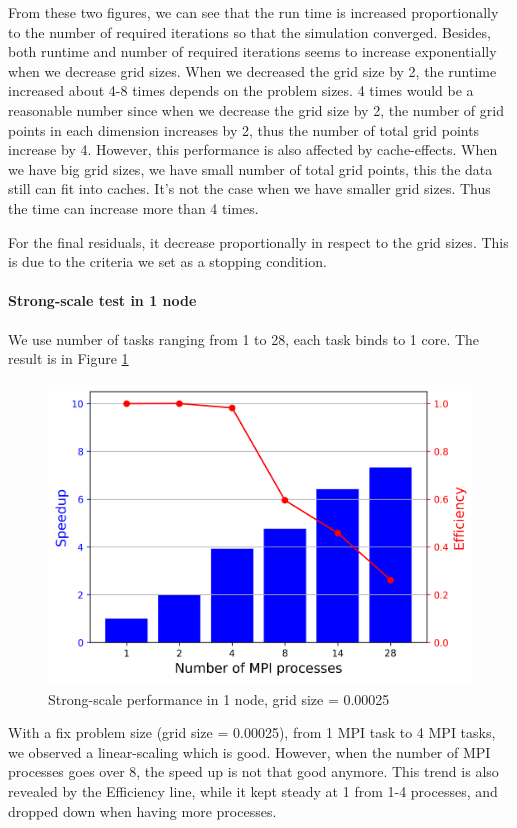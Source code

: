 \documentclass[article]{scrartcl}
\begin{document}
From these two figures, we can see that the run time is increased proportionally to the number of required iterations so that the simulation converged. Besides, both runtime and number of required iterations seems to increase exponentially when we decrease grid sizes. When we decreased the grid size by 2, the runtime increased about 4-8 times depends on the problem sizes. 4 times would be a reasonable number since when we decrease the grid size by 2, the number of grid points in each dimension increases by 2, thus the number of total grid points increase by 4. However, this performance is also affected by cache-effects. When we have big grid sizes, we have small number of total grid points, this the data still can fit into caches. It's not the case when we have smaller grid sizes. Thus the time can increase more than 4 times.

For the final residuals, it decrease proportionally in respect to the grid sizes. This is due to the criteria we set as a stopping condition. 

\paragraph{Strong-scale test in 1 node}
We use number of tasks ranging from 1 to 28, each task binds to 1 core. The result is in Figure \ref{fig:strong1}

\begin{figure}[htpb]
  \centering
  \includegraphics[width=\textwidth,height=8cm,keepaspectratio=true]{../figs/5_strong_1.png}
  \caption{Strong-scale performance in 1 node, grid size = 0.00025}
  \label{fig:strong1}
\end{figure}
With a fix problem size (grid size = 0.00025), from 1 MPI task to 4 MPI tasks, we observed a linear-scaling which is good. However, when the number of MPI processes goes over 8, the speed up is not that good anymore. This trend is also revealed by the Efficiency line, while it kept steady at 1 from 1-4 processes, and dropped down when having more processes. 
\end{document}
